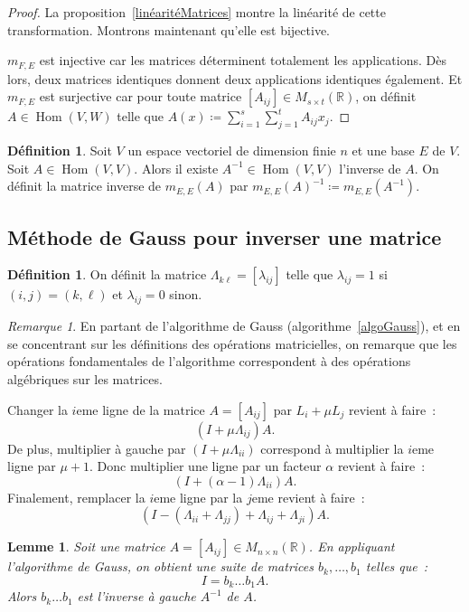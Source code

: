 \documentclass{article}
\DeclareMathOperator{\Hom}{Hom}
\newcommand{\R}{\mathbb R}
\newcommand{\M}[3]{M_{#1 \times #2}(#3)}
\newtheorem{lem}[thm]{Lemme}
\theoremstyle{definition}
\newtheorem{déf}[thm]{Définition}
\theoremstyle{remark}
\newtheorem*{rmq}{Remarque}
\begin{document}
		\begin{proof} La proposition~\ref{linéaritéMatrices} montre la linéarité de cette transformation. Montrons maintenant qu'elle est bijective.

		$m_{F, E}$ est injective car les matrices déterminent totalement les applications. Dès lors, deux matrices identiques donnent deux applications identiques
		également. Et $m_{F, E}$ est surjective car pour toute matrice $[A_{ij}] \in \M st\R$, on définit $A \in \Hom(V, W)$ telle que
		$A(x) \coloneqq \sum_{i=1}^s\sum_{j=1}^tA_{ij}x_j$. \end{proof}

		\begin{déf} Soit $V$ un espace vectoriel de dimension finie $n$ et une base $E$ de $V$. Soit $A \in \Hom(V, V)$. Alors il existe $A^{-1} \in \Hom(V, V)$ l'inverse
		de $A$. On définit la matrice inverse de $m_{E, E}(A)$ par $m_{E, E}(A)^{-1} \coloneqq m_{E, E}(A^{-1})$. \end{déf}

	\subsection{Méthode de Gauss pour inverser une matrice}
		\begin{déf} On définit la matrice $\Lambda_{k\ell} = [\lambda_{ij}]$ telle que $\lambda_{ij} = 1$ si $(i, j) = (k, \ell)$ et $\lambda_{ij} = 0$ sinon. \end{déf}

		\begin{rmq} En partant de l'algorithme de Gauss (algorithme~\ref{algoGauss}), et en se concentrant sur les définitions des opérations matricielles, on remarque
		que les opérations fondamentales de l'algorithme correspondent à des opérations algébriques sur les matrices.

		Changer la $i$eme ligne de la matrice $A = [A_{ij}]$ par $L_i + \mu L_j$ revient à faire~: \[(I + \mu \Lambda_{ij})A.\] De plus, multiplier à gauche par
		$(I + \mu\Lambda_{ii})$ correspond à multiplier la $i$eme ligne par $\mu+1$. Donc multiplier une ligne par un facteur $\alpha$ revient à faire~:
		\[(I + (\alpha-1)\Lambda_{ii})A.\] Finalement, remplacer la $i$eme ligne par la $j$eme revient à faire~:
		\[(I - (\Lambda_{ii} + \Lambda_{jj}) + \Lambda_{ij} + \Lambda_{ji})A.\] \end{rmq}

		\begin{lem} Soit une matrice $A = [A_{ij}] \in \M nn\R$. En appliquant l'algorithme de Gauss, on obtient une suite de matrices $b_k, \dotsc, b_1$ telles que~:
		\[I = b_k\ldots b_1A.\] Alors $b_k \ldots b_1$ est l'inverse à gauche $A^{-1}$ de $A$. \end{lem}
\end{document}

